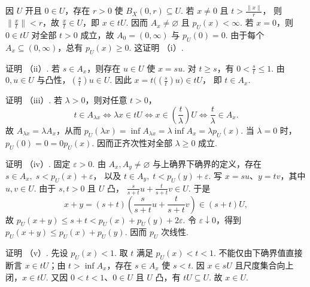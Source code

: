 \begin{FAProof}
因 \(\displaystyle U\) 开且 \(\displaystyle0\in U\)，存在 \(\displaystyle r>0\) 使 \(\displaystyle B_X(0,r)\subseteq U\). 若 \(\displaystyle x\neq0\) 且 \(\displaystyle t>\frac{\|x\|}{r}\)，
则 \(\displaystyle \|\frac{x}{t}\|<r\)，故 \(\displaystyle \frac{x}{t}\in U\)，即 \(\displaystyle x\in tU\). 因而 \(\displaystyle A_x\neq\varnothing\) 且 \(\displaystyle p_U(x)<\infty\). 若 \(\displaystyle x=0\)，则 \(\displaystyle0\in tU\) 对全部 \(\displaystyle t>0\) 成立，故 \(\displaystyle A_0=(0,\infty)\) 与 \(\displaystyle p_U(0)=0\). 由于每个 \(\displaystyle A_x\subseteq(0,\infty)\)，总有 \(\displaystyle p_U(x)\geqslant0\). 这证明 （i）.

证明 （ii）. 若 \(\displaystyle s\in A_x\)，则存在 \(\displaystyle u\in U\) 使 \(\displaystyle x=su\). 对 \(\displaystyle t\geqslant s\)，有 \(\displaystyle0<\frac{s}{t}\leqslant1\). 由 \(\displaystyle0,u\in U\) 与凸性，\(\displaystyle (\frac{s}{t})u\in U\). 因此 \(\displaystyle x=t\bigl((\frac{s}{t})u\bigr)\in tU\)，
即 \(\displaystyle t\in A_x\).

证明 （iii）. 若 \(\displaystyle \lambda>0\)，则对任意 \(\displaystyle t>0\)，
\[
t\in A_{\lambda x}
\iff
\lambda x\in tU
\iff
x\in(\frac{t}{\lambda})U
\iff
\frac{t}{\lambda}\in A_x.
\]
故 \(\displaystyle A_{\lambda x}=\lambda A_x\)，从而 \(\displaystyle p_U(\lambda x) =\inf A_{\lambda x} =\lambda\inf A_x =\lambda p_U(x)\).
当 \(\displaystyle \lambda=0\) 时，\(\displaystyle p_U(0)=0=0p_U(x)\). 因而正齐次性对全部 \(\displaystyle \lambda\geqslant0\) 成立.

证明 （iv）. 固定 \(\displaystyle \varepsilon>0\). 由 \(\displaystyle A_x,A_y\neq\varnothing\) 与上确界下确界的定义，存在 \(\displaystyle s\in A_x, \; s<p_U(x)+\varepsilon\)，
以及 \(\displaystyle t\in A_y, \; t<p_U(y)+\varepsilon\).
写 \(\displaystyle x=su\)、\(\displaystyle y=tv\)，其中 \(\displaystyle u,v\in U\). 由于 \(\displaystyle s,t>0\) 且 \(\displaystyle U\) 凸， \(\displaystyle \frac{s}{s+t}u+\frac{t}{s+t}v\in U\).
于是
\[
x+y
=(s+t)\left(\frac{s}{s+t}u+\frac{t}{s+t}v\right)
\in(s+t)U,
\]
故 \(\displaystyle p_U(x+y) \leqslant s+t <p_U(x)+p_U(y)+2\varepsilon\).
令 \(\displaystyle \varepsilon\downarrow0\)，得到 \(\displaystyle p_U(x+y)\leqslant p_U(x)+p_U(y)\). 因而 \(\displaystyle p_U\) 次线性.

证明 （v）. 先设 \(\displaystyle p_U(x)<1\). 取 \(\displaystyle t\) 满足 \(\displaystyle p_U(x)<t<1\). 不能仅由下确界值直接断言 \(\displaystyle x\in tU\)；由 \(\displaystyle t>\inf A_x\)，存在 \(\displaystyle s\in A_x\) 使 \(\displaystyle s<t\). 因 \(\displaystyle x\in sU\) 且尺度集合向上闭，\(\displaystyle x\in tU\). 又因 \(\displaystyle0<t<1\)、\(\displaystyle0\in U\) 且 \(\displaystyle U\) 凸，有 \(\displaystyle tU\subseteq U\). 故 \(\displaystyle x\in U\).


\end{FAProof}
